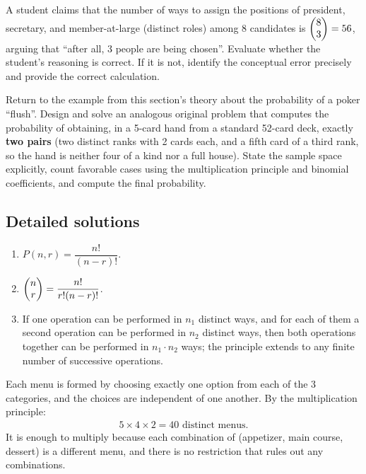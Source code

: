 \begin{problema}
	\label{prob:3007304}
	A student claims that the number of ways to assign the positions of president, secretary, and member-at-large (distinct roles) among 8 candidates is $\begin{pmatrix} 8 \\ 3\end{pmatrix} = 56$, arguing that ``after all, 3 people are being chosen''. Evaluate whether the student's reasoning is correct. If it is not, identify the conceptual error precisely and provide the correct calculation.
\end{problema}

\begin{problema}
	\label{prob:b53268b}
	Return to the example from this section's theory about the probability of a poker ``flush''. Design and solve an analogous original problem that computes the probability of obtaining, in a 5-card hand from a standard 52-card deck, exactly \textbf{two pairs} (two distinct ranks with 2 cards each, and a fifth card of a third rank, so the hand is neither four of a kind nor a full house). State the sample space explicitly, count favorable cases using the multiplication principle and binomial coefficients, and compute the final probability.
\end{problema}

\subsection*{Detailed solutions}

\begin{solproblema}[prob:6369f2a]
	\begin{enumerate}
		\item $P(n,r) = \dfrac{n!}{(n-r)!}$.
		\item $\begin{pmatrix} n \\ r\end{pmatrix} = \dfrac{n!}{r!(n-r)!}$.
		\item If one operation can be performed in $n_1$ distinct ways, and for each of them a second operation can be performed in $n_2$ distinct ways, then both operations together can be performed in $n_1 \cdot n_2$ ways; the principle extends to any finite number of successive operations.
	\end{enumerate}
\end{solproblema}

\begin{solproblema}[prob:4f6f981]
	Each menu is formed by choosing exactly one option from each of the 3 categories, and the choices are independent of one another. By the multiplication principle:
	\begin{align}
		5 \times 4 \times 2 = 40 \text{ distinct menus.}
	\end{align}
	It is enough to multiply because each combination of (appetizer, main course, dessert) is a different menu, and there is no restriction that rules out any combinations.
\end{solproblema}

